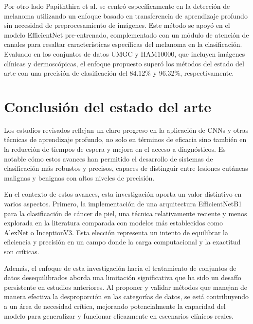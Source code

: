 Por otro lado Papiththira et al.  se centró específicamente en la detección de melanoma utilizando un enfoque basado en transferencia de aprendizaje profundo sin necesidad de preprocesamiento de imágenes. Este método se apoyó en el modelo EfficientNet pre-entrenado, complementado con un módulo de atención de canales para resaltar características específicas del melanoma en la clasificación. Evaluado en los conjuntos de datos UMGC y HAM10000, que incluyen imágenes clínicas y dermoscópicas, el enfoque propuesto superó los métodos del estado del arte con una precisión de clasificación del 84.12\% y 96.32\%, respectivamente.

\section{Conclusión del estado del arte}

Los estudios revisados reflejan un claro progreso en la aplicación de CNNs y otras técnicas de aprendizaje profundo, no solo en términos de eficacia sino también en la reducción de tiempos de espera y mejora en el acceso a diagnósticos. Es notable cómo estos avances han permitido el desarrollo de sistemas de clasificación más robustos y precisos, capaces de distinguir entre lesiones cutáneas malignas y benignas con altos niveles de precisión.

En el contexto de estos avances, esta investigación aporta un valor distintivo en varios aspectos. Primero, la implementación de una arquitectura EfficientNetB1 para la clasificación de cáncer de piel, una técnica relativamente reciente y menos explorada en la literatura comparada con modelos más establecidos como AlexNet o InceptionV3. Esta elección representa un intento de equilibrar la eficiencia y precisión en un campo donde la carga computacional y la exactitud son críticas.

Además, el enfoque de esta investigación hacia el tratamiento de conjuntos de datos desequilibrados aborda una limitación significativa que ha sido un desafío persistente en estudios anteriores. Al proponer y validar métodos que manejan de manera efectiva la desproporción en las categorías de datos, se está contribuyendo a un área de necesidad crítica, mejorando potencialmente la capacidad del modelo para generalizar y funcionar eficazmente en escenarios clínicos reales.
